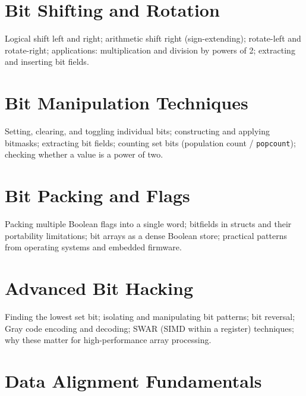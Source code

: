 \chapter{Bit Shifting and Rotation}
\label{ch:bit-shifting}

Logical shift left and right; arithmetic shift right (sign-extending);
rotate-left and rotate-right; applications: multiplication and division by
powers of 2; extracting and inserting bit fields.

\chapter{Bit Manipulation Techniques}
\label{ch:bit-techniques}

Setting, clearing, and toggling individual bits; constructing and applying
bitmasks; extracting bit fields; counting set bits (population count /
\texttt{popcount}); checking whether a value is a power of two.

\chapter{Bit Packing and Flags}
\label{ch:bit-packing}

Packing multiple Boolean flags into a single word; bitfields in structs and
their portability limitations; bit arrays as a dense Boolean store; practical
patterns from operating systems and embedded firmware.

\chapter{Advanced Bit Hacking}
\label{ch:bit-hacking}

Finding the lowest set bit; isolating and manipulating bit patterns; bit
reversal; Gray code encoding and decoding; SWAR (SIMD within a register)
techniques; why these matter for high-performance array processing.


%

\chapter{Data Alignment Fundamentals}
\label{ch:alignment-fundamentals}

